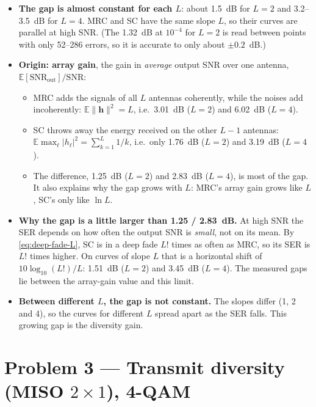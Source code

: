 \documentclass[11pt,a4paper]{article}
\newcommand{\snr}{\mathrm{SNR}}
\newcommand{\E}{\mathbb{E}}
\newcommand{\norm}[1]{\lVert #1 \rVert}
\newcommand{\abs}[1]{\lvert #1 \rvert}
\newcommand{\h}{\mathbf{h}}
\begin{document}
\begin{itemize}
  \item \textbf{The gap is almost constant for each $L$}: about 1.5~dB for $L = 2$
        and 3.2--3.5~dB for $L = 4$. MRC and SC have the same slope $L$, so their
        curves are parallel at high SNR. (The 1.32~dB at $10^{-4}$ for $L = 2$ is read
        between points with only 52--286 errors, so it is accurate to only about
        $\pm0.2$~dB.)
  \item \textbf{Origin: array gain}, the gain in \emph{average} output
        SNR over one antenna, $\E[\snr_{\mathrm{out}}]/\snr$:
        \begin{itemize}
          \item MRC adds the signals of all $L$ antennas coherently, while the noises
                add incoherently: $\E\norm{\h}^2 = L$, i.e.\ 3.01~dB ($L = 2$) and
                6.02~dB ($L = 4$).
          \item SC throws away the energy received on the other $L - 1$ antennas:
                $\E\max_\ell\abs{h_\ell}^2 = \sum_{k=1}^{L}1/k$, i.e.\ only 1.76~dB
                ($L = 2$) and 3.19~dB ($L = 4$).
          \item The difference, 1.25~dB ($L = 2$) and 2.83~dB ($L = 4$), is most of
                the gap. It also explains why the gap grows with $L$: MRC's array gain
                grows like $L$, SC's only like $\ln L$.
        \end{itemize}
  \item \textbf{Why the gap is a little larger than 1.25 / 2.83~dB.} At high SNR the
        SER depends on how often the output SNR is \emph{small}, not on its mean. By
        \eqref{eq:deep-fade-L}, SC is in a deep fade $L!$ times as often as MRC, so
        its SER is $L!$ times higher. On curves of slope $L$ that is a horizontal
        shift of $10\log_{10}(L!)/L$: 1.51~dB ($L = 2$) and 3.45~dB ($L = 4$). The
        measured gaps lie between the array-gain value and this limit.
  \item \textbf{Between different $L$, the gap is not constant.} The slopes differ (1, 2
        and 4), so the curves for different $L$ spread apart as the SER falls. This
        growing gap is the diversity gain.
\end{itemize}

\section{Problem 3 --- Transmit diversity (MISO \texorpdfstring{$2 \times 1$}{2 x 1}), 4-QAM}
\label{sec:p3}
\end{document}
